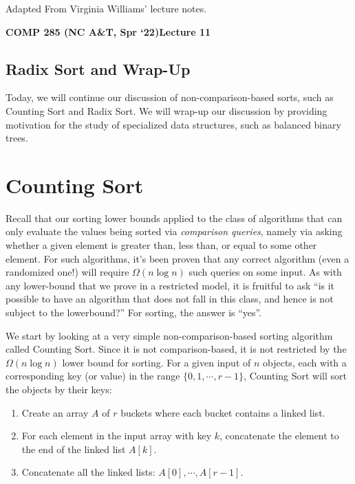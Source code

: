 \documentclass [12pt]{article}
\begin{document}
 

\vspace {1em} 
\begin {Instruction} 
Adapted From Virginia Williams' lecture notes.
\end {Instruction}  

{\LARGE \textbf {COMP 285 (NC A\&T, Spr `22)}\hfill \textbf {Lecture 11} } 

\begin{centering}
\section*{Radix Sort and Wrap-Up}
\end{centering}

Today, we will continue our discussion of non-comparison-based sorts, such as Counting Sort and Radix Sort. We will wrap-up our discussion by providing motivation for the study of specialized data structures, such as balanced binary trees.

\section{Counting Sort} 
Recall that our sorting lower bounds applied to the class of algorithms that can only evaluate the values being sorted via \textit{comparison queries}, namely via asking whether a given element is greater than, less than, or equal to some other element. For such algorithms, it's been proven that any correct algorithm (even a randomized one!) will require $\Omega(n \log n)$ such queries on some input. As with any lower-bound that we prove in a restricted model, it is fruitful to ask ``is it possible to have an algorithm that does not fall in this class, and hence is not subject to the lowerbound?'' For sorting, the answer is ``yes''.

We start by looking at a very simple non-comparison-based sorting algorithm called Counting Sort. Since it is not comparison-based, it is not restricted by the $\Omega(n \log n)$ lower bound for sorting. For a given input of $n$ objects, each with a corresponding key (or value) in the range $\{0, 1, \cdots, r - 1\}$, Counting Sort will sort the objects by their keys: 

\begin{enumerate}
  \item Create an array $A$ of $r$ buckets where each bucket contains a linked list. 
  \item For each element in the input array with key $k$, concatenate the element to the end of the linked list $A[k]$. 
  \item Concatenate all the linked lists: $A[0], \cdots , A[r - 1]$.
\end{enumerate}
\end{document}
